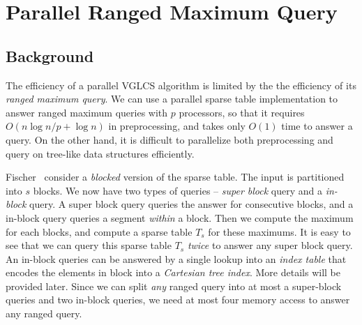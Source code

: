 \section{Parallel Ranged Maximum Query}
\label{sec:parallelRMQ}

\subsection{Background}

The efficiency of a parallel VGLCS algorithm is limited by the the
efficiency of its {\em ranged maximum query}.  We can use a parallel
sparse table implementation to answer ranged maximum queries with $p$
processors, so that it requires $O(n \log n / p + \log n)$ in
preprocessing, and takes only $O(1)$ time to answer a query.  On the
other hand, it is difficult to parallelize both preprocessing and
query on tree-like data structures efficiently.

Fischer~\cite{Fischer2006TheoreticalAP} consider a {\em blocked}
version of the sparse table.  The input is partitioned into $s$ blocks.
We now have two types of queries -- {\em super block} query and a {\em
  in-block} query.  A super block query queries the answer for
consecutive blocks, and a in-block query queries a segment {\em
  within} a block.  Then we compute the maximum for each blocks, and
compute a sparse table $T_s$ for these maximums.  It is easy to see
that we can query this sparse table $T_s$ {\em twice} to answer any
super block query.  An in-block queries can be answered by a single
lookup into an {\em index table} that encodes the elements in block
into a {\em Cartesian tree index}.  More details will be provided
later.  Since we can split {\em any} ranged query into at most a
super-block queries and two in-block queries, we need at most four
memory access to answer any ranged query.

